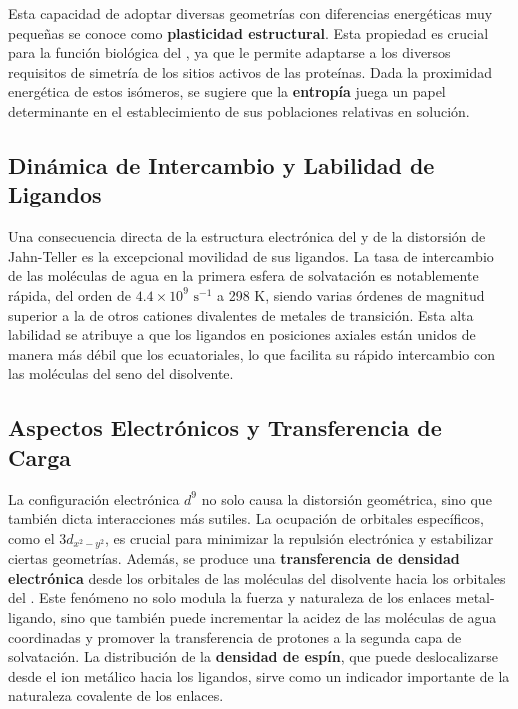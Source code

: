 Esta capacidad de adoptar diversas geometrías con diferencias energéticas muy pequeñas se conoce como \textbf{plasticidad estructural}. Esta propiedad es crucial para la función biológica del , ya que le permite adaptarse a los diversos requisitos de simetría de los sitios activos de las proteínas. Dada la proximidad energética de estos isómeros, se sugiere que la \textbf{entropía} juega un papel determinante en el establecimiento de sus poblaciones relativas en solución.

\subsection{Dinámica de Intercambio y Labilidad de Ligandos}

Una consecuencia directa de la estructura electrónica del  y de la distorsión de Jahn-Teller es la excepcional movilidad de sus ligandos. La tasa de intercambio de las moléculas de agua en la primera esfera de solvatación es notablemente rápida, del orden de $4.4 \times 10^9 \text{ s}^{-1}$ a 298 K, siendo varias órdenes de magnitud superior a la de otros cationes divalentes de metales de transición. Esta alta labilidad se atribuye a que los ligandos en posiciones axiales están unidos de manera más débil que los ecuatoriales, lo que facilita su rápido intercambio con las moléculas del seno del disolvente.

\subsection{Aspectos Electrónicos y Transferencia de Carga}

La configuración electrónica $d^9$ no solo causa la distorsión geométrica, sino que también dicta interacciones más sutiles. La ocupación de orbitales específicos, como el $3d_{x^2-y^2}$, es crucial para minimizar la repulsión electrónica y estabilizar ciertas geometrías. Además, se produce una \textbf{transferencia de densidad electrónica} desde los orbitales de las moléculas del disolvente hacia los orbitales del . Este fenómeno no solo modula la fuerza y naturaleza de los enlaces metal-ligando, sino que también puede incrementar la acidez de las moléculas de agua coordinadas y promover la transferencia de protones a la segunda capa de solvatación. La distribución de la \textbf{densidad de espín}, que puede deslocalizarse desde el ion metálico hacia los ligandos, sirve como un indicador importante de la naturaleza covalente de los enlaces.

